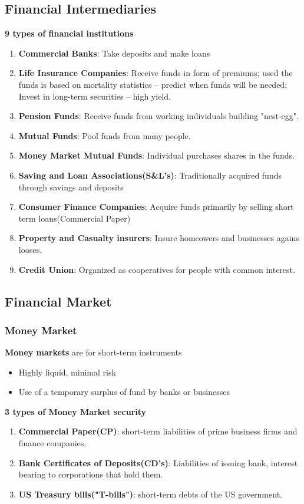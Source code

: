 \documentclass{article}
\theoremstyle{definition}
\theoremstyle{thrm}
\theoremstyle{lma}
\theoremstyle{ppst}
\theoremstyle{crlr}
\begin{document}
\subsection{Financial Intermediaries}
\textbf{9 types of financial institutions}
\begin{enumerate}
	\item \textbf{Commercial Banks}: Take deposits and make loans
	\item \textbf{Life Insurance Companies}: Receive funds in form of premiums; used the funds is based on mortality statistics -- predict when funds will be needed; Invest in long-term securities -- high yield.
	\item \textbf{Pension Funds}: Receive funds from working individuals building "nest-egg".
	\item \textbf{Mutual Funds}: Pool funds from many people.
	\item \textbf{Money Market Mutual Funds}: Individual purchases shares in the funds.
	\item \textbf{Saving and Loan Associations(S\&L's)}: Traditionally acquired funds through savings and deposits
	\item \textbf{Consumer Finance Companies}: Acquire funds primarily by selling short term loans(Commercial Paper)
	\item \textbf{Property and Casualty insurers}: Insure homeowers and businesses agains looses. 
	\item \textbf{Credit Union}: Organized as cooperatives for people with common interest.
\end{enumerate}
\subsection{Financial Market}
\subsubsection{Money Market}
\textbf{Money markets} are for short-term instruments
\begin{itemize}
	\item Highly liquid, minimal risk
	\item Use of a temporary surplus of fund by banks or businesses
\end{itemize}
\textbf{3 types of Money Market security}
\begin{enumerate}
	\item \textbf{Commercial Paper(CP)}: short-term liabilities of prime business firms and finance companies.
	\item \textbf{Bank Certificates of Deposits(CD's)}: Liabilities of issuing bank, interest bearing to corporations that hold them.
	\item \textbf{US Treasury bills("T-bills")}: short-term debts of the US government. 
\end{enumerate}
\end{document}
